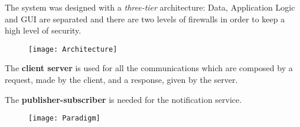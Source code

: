 \begin{frame}[allowframebreaks]{\currentname}

The system was designed with a \emph{three-tier} architecture: Data, Application Logic and GUI are separated and there are two levels of firewalls in order to keep a high level of security.

\begin{figure}[H]
\texttt{[image: Architecture]}
\centering
\end{figure}

The \textbf{client server} is used for all the communications which are composed by a request, made by the client, and a response, given by the server.

The \textbf{publisher-subscriber} is needed for the notification service.

\begin{figure}[H]
\texttt{[image: Paradigm]}
\centering
\end{figure}

\end{frame}